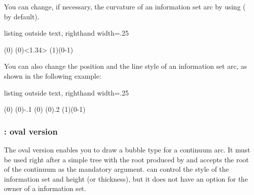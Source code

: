 You can change, if necessary, the curvature of an information set arc by using  ( by default).

\begin{tcblisting}{listing outside text, righthand width=.25\linewidth}
\begin{istgame}[scale=1.5]
\istrootcntmA(0)
  \istbA  \endist
\cntmAInfoset(0)<1.34>
\xtdistance{10mm}{20mm}
\istroot(1)(0-1)
  \istb  \istb  \endist
\end{istgame}
\end{tcblisting}


You can also change the position and the line style of an information set arc, as shown in the following example:

\begin{tcblisting}{listing outside text, righthand width=.25\linewidth}
\begin{istgame}[scale=1.5]
\istrootcntmA(0)
  \istbA  \endist
{}(0){-.1}
\cntmAInfoset(0)
(0){.2}
\xtdistance{10mm}{20mm}
\istroot(1)(0-1)
  \istb  \istb  \endist
\end{istgame}
\end{tcblisting}

\subsubsection{\protect\cmd{\cntmAInfosetO}: oval version}
\label{sec:cntmAInfosetO}

The oval version \icmd{\cntmAInfosetO} enables you to draw a bubble type  for a continuum arc. It must be used right after a simple tree with the root produced by \cmd{\istrootcntmA} and accepts the root of the continuum as the mandatory argument. \cmd{\cntmAInfosetO} can control the style of the information set and height (or thickness), but it does not have an option for the owner of a information set.

